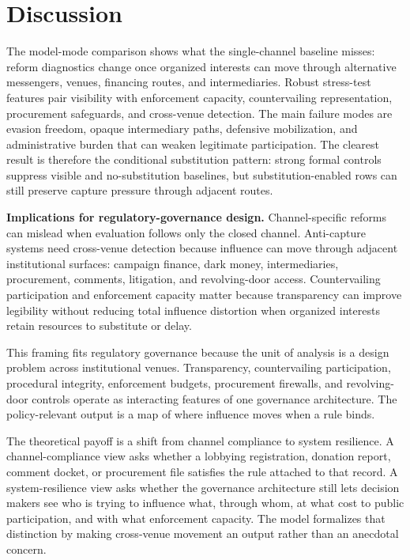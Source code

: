 \section{Discussion}

The model-mode comparison shows what the single-channel baseline misses: reform diagnostics change once organized interests can move through alternative messengers, venues, financing routes, and intermediaries. Robust stress-test features pair visibility with enforcement capacity, countervailing representation, procurement safeguards, and cross-venue detection. The main failure modes are evasion freedom, opaque intermediary paths, defensive mobilization, and administrative burden that can weaken legitimate participation. The clearest result is therefore the conditional substitution pattern: strong formal controls suppress visible and no-substitution baselines, but substitution-enabled rows can still preserve capture pressure through adjacent routes.

\textbf{Implications for regulatory-governance design.} Channel-specific reforms can mislead when evaluation follows only the closed channel. Anti-capture systems need cross-venue detection because influence can move through adjacent institutional surfaces: campaign finance, dark money, intermediaries, procurement, comments, litigation, and revolving-door access. Countervailing participation and enforcement capacity matter because transparency can improve legibility without reducing total influence distortion when organized interests retain resources to substitute or delay.

This framing fits regulatory governance because the unit of analysis is a design problem across institutional venues. Transparency, countervailing participation, procedural integrity, enforcement budgets, procurement firewalls, and revolving-door controls operate as interacting features of one governance architecture. The policy-relevant output is a map of where influence moves when a rule binds.

The theoretical payoff is a shift from channel compliance to system resilience. A channel-compliance view asks whether a lobbying registration, donation report, comment docket, or procurement file satisfies the rule attached to that record. A system-resilience view asks whether the governance architecture still lets decision makers see who is trying to influence what, through whom, at what cost to public participation, and with what enforcement capacity. The model formalizes that distinction by making cross-venue movement an output rather than an anecdotal concern.

